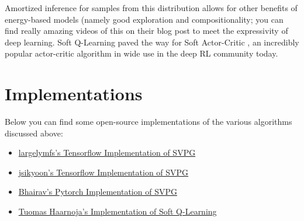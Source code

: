 \documentclass[12pt]{article}
\begin{document}
\noindent  Amortized inference for samples from this distribution allows for other benefits of energy-based models (namely good exploration and compositionality; you can find really amazing videos of this on their blog post \cite{bairblogmaxent} to meet the expressivity of deep learning. Soft Q-Learning paved the way for Soft Actor-Critic \cite{haarnoja2018soft}, an incredibly popular actor-critic algorithm in wide use in the deep RL community today.

\section{Implementations}

Below you can find some open-source implementations of the various algorithms discussed above:

\begin{itemize}
    \item \href{https://github.com/largelymfs/svpg_REINFORCE}{largelymfs's Tensorflow Implementation of SVPG}
    \item \href{https://github.com/jsikyoon/svpg_tensorflow}{jsikyoon's Tensorflow Implementation of SVPG}
    \item \href{https://github.com/montrealrobotics/active-domainrand/tree/master/common/svpg}{Bhairav's Pytorch Implementation of SVPG}
    \item \href{https://github.com/haarnoja/softqlearning}{Tuomas Haarnoja's Implementation of Soft Q-Learning}
\end{itemize}



\end{document}
